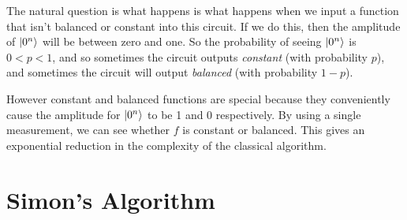 

The natural question is what happens is what happens when we input a function that 
isn't balanced or constant into this circuit. If we do this, then the 
amplitude of $\left|0^n\right\rangle$ will be between zero and one. So the probability of 
seeing $\left|0^n\right\rangle$ is $0 < p < 1$, and so sometimes the circuit outputs 
\textit{constant} (with probability $p$), and sometimes the circuit will 
output \textit{balanced} (with probability $1-p$).

However constant and balanced functions are special because they
conveniently cause the amplitude for $\left|0^n\right\rangle$ to be 1 and 0 respectively.
By using a single measurement, we can see whether $f$ is
constant or balanced. This gives an exponential reduction in
the complexity of the classical algorithm.

\section{Simon's Algorithm}